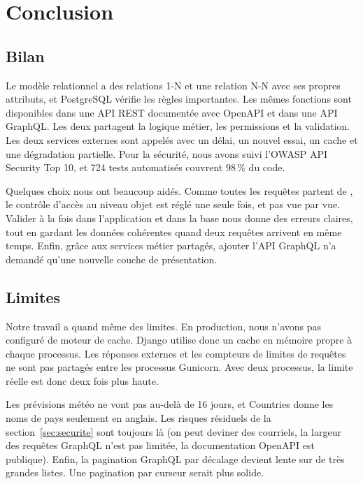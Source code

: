 \section{Conclusion}
\label{sec:conclusion}

\subsection{Bilan}

Le modèle relationnel a des relations 1-N et une relation N-N avec ses propres attributs, et PostgreSQL vérifie les règles importantes. Les mêmes fonctions sont disponibles dans une API REST documentée avec OpenAPI et dans une API GraphQL. Les deux partagent la logique métier, les permissions et la validation. Les deux services externes sont appelés avec un délai, un nouvel essai, un cache et une dégradation partielle. Pour la sécurité, nous avons suivi l'OWASP API Security Top 10, et 724 tests automatisés couvrent 98\,\% du code.

Quelques choix nous ont beaucoup aidés. Comme toutes les requêtes partent de , le contrôle d'accès au niveau objet est réglé une seule fois, et pas vue par vue. Valider à la fois dans l'application et dans la base nous donne des erreurs claires, tout en gardant les données cohérentes quand deux requêtes arrivent en même temps. Enfin, grâce aux services métier partagés, ajouter l'API GraphQL n'a demandé qu'une nouvelle couche de présentation.

\subsection{Limites}

Notre travail a quand même des limites. En production, nous n'avons pas configuré de moteur de cache. Django utilise donc un cache en mémoire propre à chaque processus. Les réponses externes et les compteurs de limites de requêtes ne sont pas partagés entre les processus Gunicorn. Avec deux processus, la limite réelle est donc deux fois plus haute.

Les prévisions météo ne vont pas au-delà de 16 jours, et Countries donne les noms de pays seulement en anglais. Les risques résiduels de la section~\ref{sec:securite} sont toujours là (on peut deviner des courriels, la largeur des requêtes GraphQL n'est pas limitée, la documentation OpenAPI est publique). Enfin, la pagination GraphQL par décalage devient lente sur de très grandes listes. Une pagination par curseur serait plus solide.
